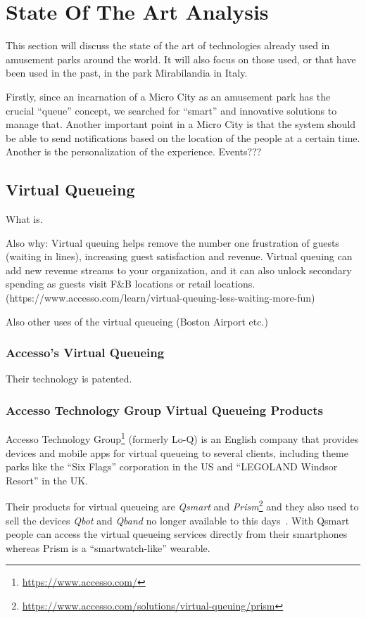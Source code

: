 \section{State Of The Art Analysis}\label{sec:state-of-the-art-analysis}
This section will discuss the state of the art of technologies already used in amusement parks around the world.
It will also focus on those used, or that have been used in the past, in the park Mirabilandia in Italy.

Firstly, since an incarnation of a Micro City as an amusement park has the crucial ``queue'' concept, we searched for ``smart''
and innovative solutions to manage that.
Another important point in a Micro City is that the system should be able to send notifications based on the location of
the people at a certain time.
Another is the personalization of the experience.
Events???

\subsection{Virtual Queueing}\label{subsec:virtual-queueing}
What is.

Also why: Virtual queuing helps remove the number one frustration of guests (waiting in lines), increasing guest
satisfaction and revenue.
Virtual queuing can add new revenue streams to your organization, and it can also unlock
secondary spending as guests visit F&B locations or retail locations.
(https://www.accesso.com/learn/virtual-queuing-less-waiting-more-fun)

Also other uses of the virtual queueing (Boston Airport etc.)
\subsubsection{Accesso's Virtual Queueing}
Their technology is patented.

\subsubsection{Accesso Technology Group Virtual Queueing Products}
Accesso Technology Group\footnote{\url{https://www.accesso.com/}} (formerly Lo-Q) is an English company that provides
devices and mobile apps for virtual queueing to several clients, including theme parks like the ``Six Flags'' corporation in the US
and ``LEGOLAND Windsor Resort'' in the UK\@.

Their products for virtual queueing are \textit{Qsmart} and \textit{Prism}\footnote{\url{https://www.accesso.com/solutions/virtual-queuing/prism}}
and they also used to sell the devices \textit{Qbot} and \textit{Qband} no longer available to this days~\cite{accesso-wikipedia}.
With Qsmart people can access the virtual queueing services directly from their smartphones whereas Prism is a ``smartwatch-like''
wearable.

